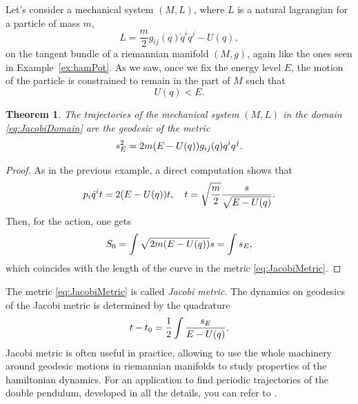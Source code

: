 \documentclass[english,fontsize=11pt,paper=a5,oneside]{scrbook}
\let\d\relax
\newcommand{\d}{\mathrm{d}}
\newtheorem{theorem}{Theorem}[chapter]
\theoremstyle{definition}
\newenvironment{example}
  {\pushQED{\qed}\renewcommand{\qedsymbol}{$\lozenge$}\examplex}
  {\popQED\endexamplex}
\begin{document}
\begin{example}[Jacobi metric]
  Let's consider a mechanical system $(M,L)$, where $L$ is a natural lagrangian for a particle of mass $m$,
  \begin{equation}
    L = \frac m2 g_{ij}(q) \dot q^i \dot q^j - U(q),
  \end{equation}
  on the tangent bundle of a riemannian manifold $(M,g)$, again like the ones seen in Example~\ref{ex:hamPot}.
  As we saw, once we fix the energy level $E$, the motion of the particle is constrained to remain in the part of $M$ such that
  \begin{equation}\label{eq:JacobiDomain}
    U(q) < E.
  \end{equation}

  \begin{theorem}
    The trajectories of the mechanical system $(M,L)$ in the domain \eqref{eq:JacobiDomain} are the geodesic of the metric
    \begin{equation}\label{eq:JacobiMetric}
      \d s^2_E = 2m (E-U(q)) g_{ij}(q)\d q^i \d q^j.
    \end{equation}
  \end{theorem}
  \begin{proof}
    As in the previous example, a direct computation shows that
    \begin{equation}
      p_i \dot q^i \d t = 2 (E-U(q)) \d t, \quad
      \d t = \sqrt{\frac{m}{2}} \frac{\d s}{\sqrt{E-U(q)}}.
    \end{equation}
    Then, for the action, one gets
    \begin{equation}
      S_0 = \int \sqrt{2m(E-U(q))}\d s = \int \d s_E,
    \end{equation}
    which coincides with the length of the curve in the metric \eqref{eq:JacobiMetric}.
  \end{proof}

  The metric \eqref{eq:JacobiMetric} is called \emph{Jacobi metric}.
  The dynamics on geodesics of the Jacobi metric is determined by the quadrature
  \begin{equation}
    t - t_0 = \frac12 \int \frac{\d s_E}{E-U(q)}.
  \end{equation}
  Jacobi metric is often useful in practice, allowing to use the whole machinery around geodesic motions in riemannian manifolds to study properties of the hamiltonian dynamics.
  For an application to find periodic trajectories of the double pendulum, developed in all the details, you can refer to \cite[Example 8.32]{book:knauf}.
\end{example}
\end{document}
